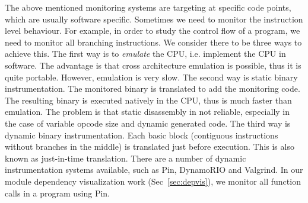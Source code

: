 The above mentioned monitoring systems are targeting at specific
code points, which are usually software specific.
Sometimes we need to monitor the instruction level behaviour.
For example, in order to study the control flow of a program,
we need to monitor all branching instructions.
We consider there to be three ways to achieve this.
The first way is to {\em emulate} the CPU, i.e.
implement the CPU in software.
The advantage is that cross architecture emulation is possible, thus
it is quite portable.
However, emulation is very slow.
The second way is static binary instrumentation.
The monitored binary is translated to add the monitoring code.
The resulting binary is executed natively in the CPU,
thus is much faster than emulation.
The problem is that static disassembly in not reliable, especially
in the case of variable opcode size and dynamic generated code.
The third way is dynamic binary instrumentation.
Each basic block (contiguous instructions without branches in the middle)
is translated just before execution.
This is also known as just-in-time translation.
There are a number of dynamic instrumentation systems available,
such as Pin\cite{luk2005pin}, DynamoRIO\cite{bruening2004dynamorio}
and Valgrind\cite{nethercote2003valgrind}.
In our module dependency visualization work (Sec~\ref{sec:depvis}),
we monitor all function calls in a program using Pin.
